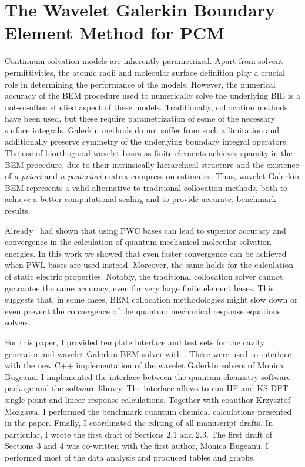 \section{The Wavelet Galerkin Boundary Element Method for PCM}\label{sec:wemlin}

Continuum solvation models are inherently parametrized. Apart from solvent permittivities,
the atomic radii and molecular surface definition play a crucial role
in determining the performance of the models.
However, the numerical accuracy of the \acs{BEM} procedure used to numerically solve the
underlying \acs{BIE} is a not-so-often studied aspect of these models.
Traditionally, collocation methods have been used, but these require parametrization of some of the necessary surface integrals.
Galerkin methods do not suffer from such a limitation and additionally preserve symmetry of the underlying
boundary integral operators.
The use of biorthogonal wavelet bases as finite elements achieves sparsity in
the \acs{BEM} procedure, due to their intrinsically hierarchical structure and
the existence of \emph{a priori} and \emph{a posteriori} matrix compression
estimates.
Thus, wavelet Galerkin \acs{BEM} represents a valid alternative to traditional
collocation methods, both to achieve a better computational scaling and to
provide accurate, benchmark results.\autocite{Harbrecht2004-uo,
Harbrecht2006-ug, Dahmen2006-pj}

Already~\citeauthor{Weijo2010-hy} had shown that using \ac{PWC} bases can lead
to superior accuracy and convergence in the calculation of quantum mechanical
molecular solvation energies.
In this work we showed that even faster convergence can be achieved when
\ac{PWL} bases are used instead.
Moreover, the same holds for the calculation of static electric properties.
Notably, the traditional collocation solver cannot guarantee the same accuracy,
even for very large finite element bases. This suggests that, in some cases,
\acs{BEM} collocation methodologies might slow down or even prevent the
convergence of the quantum mechanical response equations solvers.

For this paper, I provided template interface and test sets for the cavity
generator\autocite{Harbrecht2009-no, Harbrecht2011-dk} and wavelet Galerkin
\acs{BEM} solver\autocite{Harbrecht2004-uo, Harbrecht2006-ug} with \pcmsolver.
These were used to interface with the new C++ implementation of the wavelet
Galerkin solvers of Monica Bugeanu.
I implemented the interface between the \LSDALTON quantum chemistry software
package and the \pcmsolver software library. The interface allows to run \acs{HF} and
\acs{KS}-\acs{DFT} single-point and linear response calculations.
Together with coauthor Krzysztof Mozgawa, I performed the benchmark quantum
chemical calculations presented in the paper.
Finally, I coordinated the editing of all manuscript drafts.
In particular, I wrote the first draft of Sections 2.1 and 2.3.
The first draft of Sections 3 and 4 was co-written with the first author, Monica Bugeanu.
I performed most of the data analysis and produced tables and graphs.

